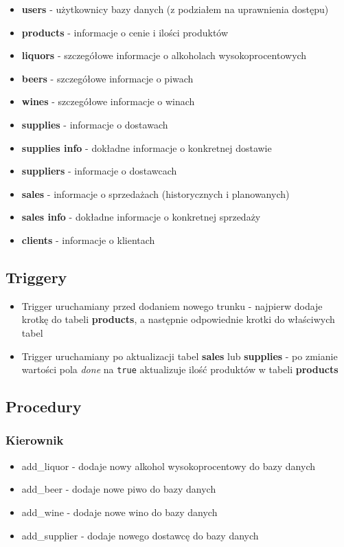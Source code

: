 \documentclass[12pt,a4paper]{article}
\begin{document}
    \begin{itemize}
        \item \textbf{users} - użytkownicy bazy danych (z podziałem na uprawnienia dostępu)
        \item \textbf{products} - informacje o cenie i ilości produktów
        \item \textbf{liquors} - szczegółowe informacje o alkoholach wysokoprocentowych
        \item \textbf{beers} - szczegółowe informacje o piwach
        \item \textbf{wines} - szczegółowe informacje o winach
        \item \textbf{supplies} - informacje o dostawach
        \item \textbf{supplies info} - dokładne informacje o konkretnej dostawie
        \item \textbf{suppliers} - informacje o dostawcach
        \item \textbf{sales} - informacje o sprzedażach (historycznych i planowanych)
        \item \textbf{sales info} - dokładne informacje o konkretnej sprzedaży
        \item \textbf{clients} - informacje o klientach
    \end{itemize}
    
\subsection*{Triggery}

    \begin{itemize}
        \item Trigger uruchamiany przed dodaniem nowego trunku - najpierw dodaje krotkę do tabeli \textbf{products}, a następnie odpowiednie krotki do właściwych tabel
        \item Trigger uruchamiany po aktualizacji tabel \textbf{sales} lub \textbf{supplies} - po zmianie wartości pola \textit{done} na \texttt{true} aktualizuje ilość produktów w tabeli \textbf{products}
    \end{itemize}        

\subsection*{Procedury}

    \subsubsection*{Kierownik}
        \begin{itemize}
            \item \textsf{add\_liquor} - dodaje nowy alkohol wysokoprocentowy do bazy danych
            \item \textsf{add\_beer} - dodaje nowe piwo do bazy danych
            \item \textsf{add\_wine} - dodaje nowe wino do bazy danych
            \item \textsf{add\_supplier} - dodaje nowego dostawcę do bazy danych
        \end{itemize}
    
\end{document}
